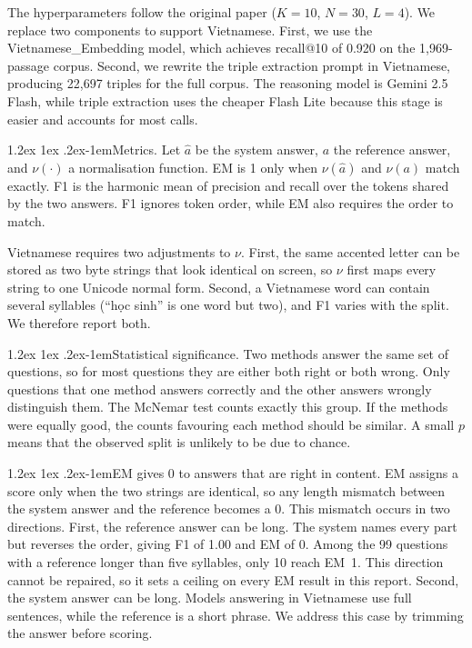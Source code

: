 \documentclass[11pt]{article}
\makeatletter
\renewcommand\paragraph{\@startsection{paragraph}{4}{\z@}%
  {1.2ex \@plus1ex \@minus.2ex}{-1em}{\normalfont\normalsize\bfseries}}
\makeatother
\begin{document}
The hyperparameters follow the original paper ($K{=}10$, $N{=}30$, $L{=}4$). We replace two
components to support Vietnamese. First, we use the Vietnamese\_Embedding model, which
achieves recall@10 of 0.920 on the 1,969-passage corpus. Second, we rewrite the triple
extraction prompt in Vietnamese, producing 22,697 triples for the full corpus. The reasoning
model is Gemini 2.5 Flash, while triple extraction uses the cheaper Flash Lite because this
stage is easier and accounts for most calls.

\paragraph{Metrics.} Let $\hat{a}$ be the system answer, $a$ the reference answer, and
$\nu(\cdot)$ a normalisation function. EM is 1 only when $\nu(\hat{a})$ and $\nu(a)$ match
exactly. F1 is the harmonic mean of precision and recall over the tokens shared by the two
answers. F1 ignores token order, while EM also requires the order to match.

Vietnamese requires two adjustments to $\nu$. First, the same accented letter can be stored
as two byte strings that look identical on screen, so $\nu$ first maps every string to one
Unicode normal form. Second, a Vietnamese word can contain several syllables
(``{\selectfont học sinh}'' is one word but two), and F1 varies with the
split. We therefore report both.

\paragraph{Statistical significance.} Two methods answer the same set of questions, so for
most questions they are either both right or both wrong. Only questions that one method
answers correctly and the other answers wrongly distinguish them. The McNemar test counts
exactly this group. If the methods were equally good, the counts favouring each method should
be similar. A small $p$ means that the observed split is unlikely to be due to chance.

\paragraph{EM gives 0 to answers that are right in content.} EM assigns a score only when
the two strings are identical, so any length mismatch between the system answer and the
reference becomes a 0. This mismatch occurs in two directions. First, the reference answer
can be long. The system names every part but reverses the order, giving F1 of 1.00 and EM of
0. Among the 99 questions with a reference longer than five syllables, only 10 reach EM~1.
This direction cannot be repaired, so it sets a ceiling on every EM result in this report.
Second, the system answer can be long. Models answering in Vietnamese use full sentences,
while the reference is a short phrase. We address this case by trimming the answer before
scoring.
\end{document}
